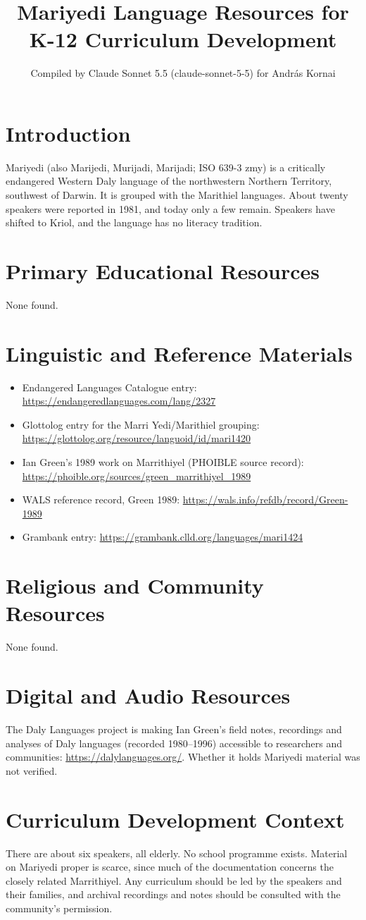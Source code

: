 \documentclass[12pt]{article}
\title{Mariyedi Language Resources for K-12 Curriculum Development}
\author{Compiled by Claude Sonnet 5.5 (claude-sonnet-5-5) for Andr\'as Kornai}
\date{}
\begin{document}
\maketitle

\section{Introduction}
Mariyedi (also Marijedi, Murijadi, Marijadi; ISO 639-3 zmy) is a critically endangered Western Daly language of the northwestern Northern Territory, southwest of Darwin. It is grouped with the Marithiel languages. About twenty speakers were reported in 1981, and today only a few remain. Speakers have shifted to Kriol, and the language has no literacy tradition.

\section{Primary Educational Resources}
None found.

\section{Linguistic and Reference Materials}
\begin{itemize}
\item Endangered Languages Catalogue entry: \url{https://endangeredlanguages.com/lang/2327}
\item Glottolog entry for the Marri Yedi/Marithiel grouping: \url{https://glottolog.org/resource/languoid/id/mari1420}
\item Ian Green's 1989 work on Marrithiyel (PHOIBLE source record): \url{https://phoible.org/sources/green_marrithiyel_1989}
\item WALS reference record, Green 1989: \url{https://wals.info/refdb/record/Green-1989}
\item Grambank entry: \url{https://grambank.clld.org/languages/mari1424}
\end{itemize}

\section{Religious and Community Resources}
None found.

\section{Digital and Audio Resources}
The Daly Languages project is making Ian Green's field notes, recordings and analyses of Daly languages (recorded 1980--1996) accessible to researchers and communities: \url{https://dalylanguages.org/}. Whether it holds Mariyedi material was not verified.

\section{Curriculum Development Context}
There are about six speakers, all elderly. No school programme exists. Material on Mariyedi proper is scarce, since much of the documentation concerns the closely related Marrithiyel. Any curriculum should be led by the speakers and their families, and archival recordings and notes should be consulted with the community's permission.
\end{document}
